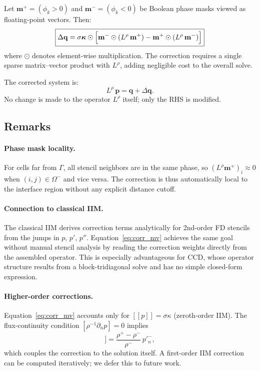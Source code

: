 \documentclass[11pt, a4paper]{article}
\newcommand{\jump}[1]{[\![#1]\!]}
\begin{document}
Let $\mathbf{m}^+ = (\phi_k > 0)$ and $\mathbf{m}^- = (\phi_k < 0)$ be
Boolean phase masks viewed as floating-point vectors.
Then:
\begin{equation}
  \boxed{
    \Delta\mathbf{q} =
    \sigma\boldsymbol{\kappa} \odot
    \Bigl[
      \mathbf{m}^- \odot (L^\rho\,\mathbf{m}^+)
      - \mathbf{m}^+ \odot (L^\rho\,\mathbf{m}^-)
    \Bigr]
  }
  \label{eq:corr_mv}
\end{equation}
where $\odot$ denotes element-wise multiplication.
The correction requires a single sparse matrix--vector product with $L^\rho$,
adding negligible cost to the overall solve.

The corrected system is:
\begin{equation}
  L^\rho\, \mathbf{p} = \mathbf{q} + \Delta\mathbf{q}. \label{eq:corrected_sys}
\end{equation}
No change is made to the operator $L^\rho$ itself; only the RHS is modified.

\subsection{Remarks}

\paragraph{Phase mask locality.}
For cells far from $\Gamma$, all stencil neighbors are in the same phase, so
$(L^\rho \mathbf{m}^+)_i \approx 0$ when $(i,j) \in \Omega^-$ and vice versa.
The correction is thus automatically local to the interface region without any
explicit distance cutoff.

\paragraph{Connection to classical IIM.}
The classical IIM \cite{leveque1994} derives correction terms analytically for
2nd-order FD stencils from the jumps in $p$, $p'$, $p''$.
Equation~\eqref{eq:corr_mv} achieves the same goal without manual stencil
analysis by reading the correction weights directly from the assembled operator.
This is especially advantageous for CCD, whose operator structure results from
a block-tridiagonal solve and has no simple closed-form expression.

\paragraph{Higher-order corrections.}
Equation~\eqref{eq:corr_mv} accounts only for $\jump{p} = \sigma\kappa$
(zeroth-order IIM).
The flux-continuity condition $[\rho^{-1}\partial_n p] = 0$ implies
\begin{equation}
  \jump{p'_n} = \frac{\rho^+ - \rho^-}{\rho^-}\,p'^-_n,
\end{equation}
which couples the correction to the solution itself.
A first-order IIM correction can be computed iteratively; we defer this to
future work.
\end{document}
